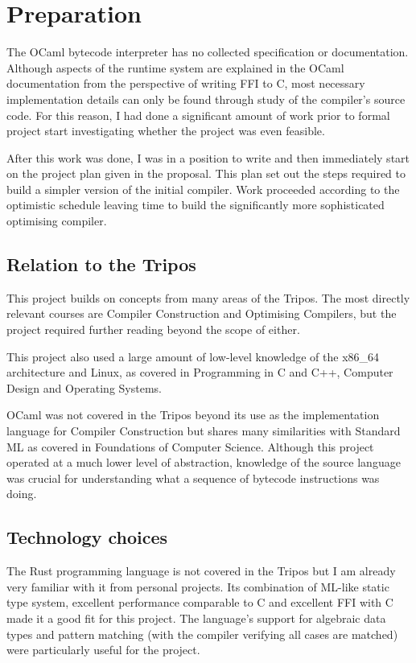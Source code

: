 \chapter{Preparation}

The OCaml bytecode interpreter has no collected specification or documentation. Although aspects of
the runtime system are explained in the OCaml documentation from the perspective of writing FFI to
C, most necessary implementation details can only be found through study of the compiler's source
code. For this reason, I had done a significant amount of work prior to formal project start
investigating whether the project was even feasible.

After this work was done, I was in a position to write and then immediately start on the project
plan given in the proposal. This plan set out the steps required to build a simpler version of the
initial compiler. Work proceeded according to the optimistic schedule leaving time to build the
significantly more sophisticated optimising compiler.

\section{Relation to the Tripos}

This project builds on concepts from many areas of the Tripos. The most directly
relevant courses are Compiler Construction and Optimising Compilers, but the project required
further
reading beyond the scope of either.

This project also used a large amount of low-level knowledge of the x86\_64 architecture and Linux,
as covered in Programming in C and C++, Computer Design and Operating Systems.

OCaml was not covered in the Tripos beyond its use as the implementation language for Compiler
Construction but shares many similarities with Standard ML as covered in Foundations of Computer
Science. Although this project operated at a much lower level of abstraction, knowledge of the
source language was crucial for understanding what a sequence of bytecode instructions was doing.

\section{Technology choices}

The Rust programming language is not covered in the Tripos but I am already very familiar with
it from personal projects. Its combination of ML-like static type system, excellent performance
comparable to C and excellent FFI with C made it a good fit for this project. The language's
support for algebraic data types and pattern matching (with the compiler verifying all cases are
matched) were particularly useful for the project.


